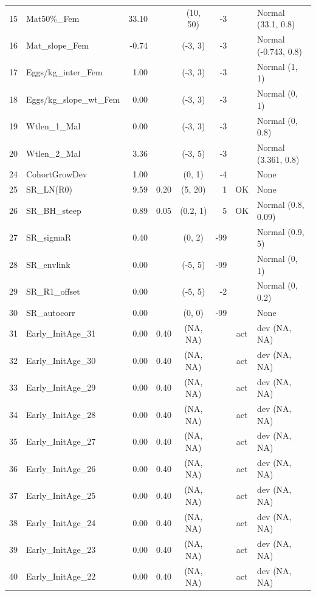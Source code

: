 \documentclass[12pt,]{article}
\begin{document}
\begin{landscape}
\begin{longtable}{rlrrcrcl}
  15 & Mat50\%\_Fem & 33.10 &  & (10, 50) & -3 &  & Normal (33.1, 0.8) \\ 
  16 & Mat\_slope\_Fem & -0.74 &  & (-3, 3) & -3 &  & Normal (-0.743, 0.8) \\ 
  17 & Eggs/kg\_inter\_Fem & 1.00 &  & (-3, 3) & -3 &  & Normal (1, 1) \\ 
  18 & Eggs/kg\_slope\_wt\_Fem & 0.00 &  & (-3, 3) & -3 &  & Normal (0, 1) \\ 
  19 & Wtlen\_1\_Mal & 0.00 &  & (-3, 3) & -3 &  & Normal (0, 0.8) \\ 
  20 & Wtlen\_2\_Mal & 3.36 &  & (-3, 5) & -3 &  & Normal (3.361, 0.8) \\ 
  24 & CohortGrowDev & 1.00 &  & (0, 1) & -4 &  & None \\ 
  25 & SR\_LN(R0) & 9.59 & 0.20 & (5, 20) & 1 & OK & None \\ 
  26 & SR\_BH\_steep & 0.89 & 0.05 & (0.2, 1) & 5 & OK & Normal (0.8, 0.09) \\ 
  27 & SR\_sigmaR & 0.40 &  & (0, 2) & -99 &  & Normal (0.9, 5) \\ 
  28 & SR\_envlink & 0.00 &  & (-5, 5) & -99 &  & Normal (0, 1) \\ 
  29 & SR\_R1\_offset & 0.00 &  & (-5, 5) & -2 &  & Normal (0, 0.2) \\ 
  30 & SR\_autocorr & 0.00 &  & (0, 0) & -99 &  & None \\ 
  31 & Early\_InitAge\_31 & 0.00 & 0.40 & (NA, NA) &  & act & dev (NA, NA) \\ 
  32 & Early\_InitAge\_30 & 0.00 & 0.40 & (NA, NA) &  & act & dev (NA, NA) \\ 
  33 & Early\_InitAge\_29 & 0.00 & 0.40 & (NA, NA) &  & act & dev (NA, NA) \\ 
  34 & Early\_InitAge\_28 & 0.00 & 0.40 & (NA, NA) &  & act & dev (NA, NA) \\ 
  35 & Early\_InitAge\_27 & 0.00 & 0.40 & (NA, NA) &  & act & dev (NA, NA) \\ 
  36 & Early\_InitAge\_26 & 0.00 & 0.40 & (NA, NA) &  & act & dev (NA, NA) \\ 
  37 & Early\_InitAge\_25 & 0.00 & 0.40 & (NA, NA) &  & act & dev (NA, NA) \\ 
  38 & Early\_InitAge\_24 & 0.00 & 0.40 & (NA, NA) &  & act & dev (NA, NA) \\ 
  39 & Early\_InitAge\_23 & 0.00 & 0.40 & (NA, NA) &  & act & dev (NA, NA) \\ 
  40 & Early\_InitAge\_22 & 0.00 & 0.40 & (NA, NA) &  & act & dev (NA, NA) \\ 

\end{longtable}
\end{landscape}
\end{document}
